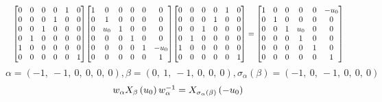 \documentclass[11pt]{article}
\theoremstyle{definition}
\begin{document}
\[
\scaletoalign{\textwidth}{{\left[\begin{matrix}0 & 0 & 0 & 0 & 1 & 0\\0 & 0 & 0 & 1 & 0 & 0\\0 & 0 & 1 & 0 & 0 & 0\\0 & 1 & 0 & 0 & 0 & 0\\1 & 0 & 0 & 0 & 0 & 0\\0 & 0 & 0 & 0 & 0 & 1\end{matrix}\right]} {\left[\begin{matrix}1 & 0 & 0 & 0 & 0 & 0\\0 & 1 & 0 & 0 & 0 & 0\\0 & u_{0} & 1 & 0 & 0 & 0\\0 & 0 & 0 & 1 & 0 & 0\\0 & 0 & 0 & 0 & 1 & - u_{0}\\0 & 0 & 0 & 0 & 0 & 1\end{matrix}\right]} {\left[\begin{matrix}0 & 0 & 0 & 0 & 1 & 0\\0 & 0 & 0 & 1 & 0 & 0\\0 & 0 & 1 & 0 & 0 & 0\\0 & 1 & 0 & 0 & 0 & 0\\1 & 0 & 0 & 0 & 0 & 0\\0 & 0 & 0 & 0 & 0 & 1\end{matrix}\right]} = {\left[\begin{matrix}1 & 0 & 0 & 0 & 0 & - u_{0}\\0 & 1 & 0 & 0 & 0 & 0\\0 & 0 & 1 & u_{0} & 0 & 0\\0 & 0 & 0 & 1 & 0 & 0\\0 & 0 & 0 & 0 & 1 & 0\\0 & 0 & 0 & 0 & 0 & 1\end{matrix}\right]}}
\]
\[
\alpha = \left( -1, \  -1, \  0, \  0, \  0, \  0\right), \beta = \left( 0, \  1, \  -1, \  0, \  0, \  0\right), \sigma_{\alpha}(\beta) = \left( -1, \  0, \  -1, \  0, \  0, \  0\right)
\]
\[
\scaletoalign{\textwidth}{w_{\alpha} X_{\beta}\left(u_{0}\right) w_{\alpha}^{-1} = X_{\sigma_{\alpha}\left(\beta\right)}\left(- u_{0}\right)}
\]
\end{document}
